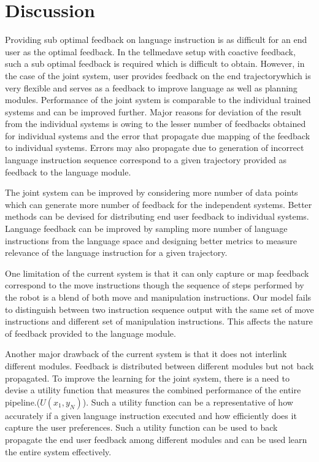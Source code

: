 \section{Discussion}
Providing sub optimal feedback on language instruction is as difficult for an end user as the optimal feedback. In the tellmedave setup with coactive feedback, such a sub optimal feedback is required which is difficult to obtain. However, in the case of the joint system, user provides feedback on the end trajectorywhich is very flexible and serves as a feedback to improve language as well as planning modules. Performance of the joint system is comparable to the individual trained systems and can be improved further. Major reasons for deviation of the result from the individual systems is owing to the lesser number of feedbacks obtained for individual systems and the error that propagate due mapping of the feedback to individual systems. Errors may also propagate due to generation of incorrect language instruction sequence correspond to a given trajectory provided as feedback to the language module.

The joint system can be improved by considering more number of data points which can generate more number of feedback for the independent systems. Better methods can be devised for distributing end user feedback to individual systems. Language feedback can be improved by sampling more number of language instructions from the language space and designing better metrics to measure relevance of the language instruction for a given trajectory.

One limitation of the current system is that it can only capture or map feedback correspond to the move instructions though the sequence of steps performed by the robot is a blend of both move and manipulation instructions. Our model fails to distinguish between two instruction sequence output with the same set of move instructions and different set of manipulation instructions. This affects the nature of feedback provided to the language module.

Another major drawback of the current system is that it does not interlink different modules. Feedback is distributed between different modules but not back propagated. To improve the learning for the joint system, there is a need to devise a utility function that measures the combined performance of the entire pipeline.($U(x_{1},y_{N})$). Such a utility function can be a representative of how accurately if a given language instruction executed and how efficiently does it capture the user preferences. Such a utility function can be used to back propagate the end user feedback among different modules and can be used learn the entire system effectively.

